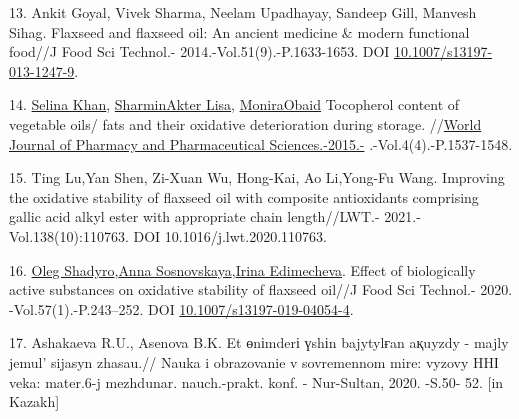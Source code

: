 \begin{refs}
13. Ankit Goyal, Vivek Sharma, Neelam Upadhayay, Sandeep Gill, Manvesh
Sihag. Flaxseed and flaxseed oil: An ancient medicine \& modern
functional food//J Food Sci Technol.- 2014.-Vol.51(9).-P.1633-1653. DOI
\href{https://doi.org/10.1007/s13197-013-1247-9}{10.1007/s13197-013-1247-9}.

14. \href{https://www.researchgate.net/scientific-contributions/Selina-Khan-2122547983?_tp=eyJjb250ZXh0Ijp7ImZpcnN0UGFnZSI6InB1YmxpY2F0aW9uIiwicGFnZSI6InB1YmxpY2F0aW9uIn19}{Selina
Khan},
\href{https://www.researchgate.net/profile/Sharmin-Lisa?_tp=eyJjb250ZXh0Ijp7ImZpcnN0UGFnZSI6InB1YmxpY2F0aW9uIiwicGFnZSI6InB1YmxpY2F0aW9uIn19}{SharminAkter
Lisa},
\href{https://www.researchgate.net/profile/Monira-Obaid?_tp=eyJjb250ZXh0Ijp7ImZpcnN0UGFnZSI6InB1YmxpY2F0aW9uIiwicGFnZSI6InB1YmxpY2F0aW9uIn19}{MoniraObaid}
Tocopherol content of vegetable oils/ fats and their oxidative
deterioration during storage.
//\href{https://www.researchgate.net/journal/World-Journal-of-Pharmacy-and-Pharmaceutical-Sciences-2278-4357?_tp=eyJjb250ZXh0Ijp7ImZpcnN0UGFnZSI6InB1YmxpY2F0aW9uIiwicGFnZSI6InB1YmxpY2F0aW9uIn19}{World
Journal of Pharmacy and Pharmaceutical Sciences.-2015.-}
.-Vol.4(4).-P.1537-1548.

15. Ting Lu,Yan Shen, Zi-Xuan Wu, Hong-Kai, Ao Li,Yong-Fu Wang.
Improving the oxidative stability of flaxseed oil with composite
antioxidants comprising gallic acid alkyl ester with appropriate chain
length//LWT.- 2021.-Vol.138(10):110763. DOI 10.1016/j.lwt.2020.110763.

16. \href{https://pubmed.ncbi.nlm.nih.gov/?term=}{Oleg
Shadyro},\href{https://pubmed.ncbi.nlm.nih.gov/?term=}{Anna
Sosnovskaya},\href{https://pubmed.ncbi.nlm.nih.gov/?term=}{Irina
Edimecheva}. Effect of biologically active substances on oxidative
stability of flaxseed oil//J Food Sci Technol.-
2020. -Vol.57(1).-P.243--252. DOI
\href{https://doi.org/10.1007/s13197-019-04054-4}{10.1007/s13197-019-04054-4}.

17. Ashakaeva R.U., Asenova B.K. Et өnіmderі үshіn bajytylғan aқuyzdy -
majly jemul' sijasyn zhasau.// Nauka i obrazovanie v
sovremennom mire: vyzovy HHІ veka: mater.6-j mezhdunar. nauch.-prakt.
konf. - Nur-Sultan, 2020. -S.50- 52. {[}in Kazakh{]}
\end{refs}


